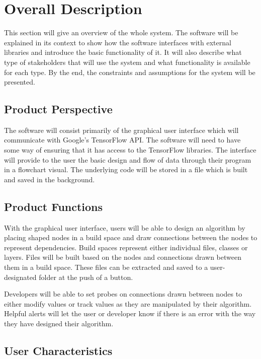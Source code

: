 \documentclass[a4paper,10pt]{article} \usepackage[margin=1.0in]{geometry} \usepackage{pdfpages} \usepackage{graphicx}
\begin{document}
\newpage

\section{Overall Description}

This section will give an overview of the whole system. 
The software will be explained in its context to show how the software interfaces with external libraries and introduce the basic functionality of it. 
It will also describe what type of stakeholders that will use the system and what functionality is available for each type. 
By the end, the constraints and assumptions for the system will be presented.

\subsection{Product Perspective}

The software will consist primarily of the graphical user interface which will communicate with Google's TensorFlow API. 
The software will need to have some way of ensuring that it has access to the TensorFlow libraries. 
The interface will provide to the user the basic design and flow of data through their program in a flowchart visual.
The underlying code will be stored in a file which is built and saved in the background. 

\subsection{Product Functions}

With the graphical user interface, users will be able to design an algorithm by placing shaped nodes in a build space and draw connections between the nodes to represent dependencies.
Build spaces represent either individual files, classes or layers. 
Files will be built based on the nodes and connections drawn between them in a build space.
These files can be extracted and saved to a user-designated folder at the push of a button.

Developers will be able to set probes on connections drawn between nodes to either modify values or track values as they are manipulated by their algorithm.
Helpful alerts will let the user or developer know if there is an error with the way they have designed their algorithm.

\subsection{User Characteristics}
\end{document}
